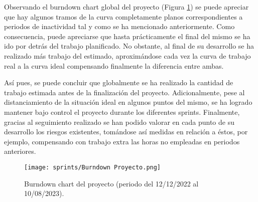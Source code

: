 Observando el burndown chart global del proyecto (Figura \ref{fig:global}) se puede apreciar que hay algunos tramos de la curva completamente planos correspondientes a periodos de inactividad tal y como se ha mencionado anteriormente. Como consecuencia, puede apreciarse que hasta prácticamente el final del mismo se ha ido por detrás del trabajo planificado. No obstante, al final de su desarrollo se ha realizado más trabajo del estimado, aproximándose cada vez la curva de trabajo real a la curva ideal compensando finalmente la diferencia entre ambas.

Así pues, se puede concluir que globalmente se ha realizado la cantidad de trabajo estimada antes de la finalización del proyecto. Adicionalmente, pese al distanciamiento de la situación ideal en algunos puntos del mismo, se ha logrado mantener bajo control el proyecto durante los diferentes sprints. Finalmente, gracias al seguimiento realizado se han podido valorar en cada punto de su desarrollo los riesgos existentes, tomándose así medidas en relación a éstos, por ejemplo, compensando con trabajo extra las horas no empleadas en periodos anteriores.

\begin{figure}[H]
    \centering
    \texttt{[image: sprints/Burndown Proyecto.png]}
    \caption{Burndown chart del proyecto (periodo del 12/12/2022 al 10/08/2023).}
    \label{fig:global}
\end{figure}